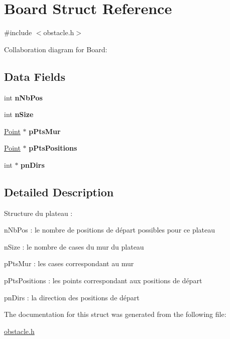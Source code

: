 \hypertarget{struct_board}{}\section{Board Struct Reference}
\label{struct_board}


{\ttfamily \#include $<$obstacle.\+h$>$}



Collaboration diagram for Board\+:
\subsection*{Data Fields}
\begin{DoxyCompactItemize}
\item 
\hypertarget{struct_board_a5144d35dd645892013c497cebb2e9b1f}{}int {\bfseries n\+Nb\+Pos}\label{struct_board_a5144d35dd645892013c497cebb2e9b1f}

\item 
\hypertarget{struct_board_a69eba13a7543e1379e705b54823531a9}{}int {\bfseries n\+Size}\label{struct_board_a69eba13a7543e1379e705b54823531a9}

\item 
\hypertarget{struct_board_a15b7375925a07516d82c52733ec16874}{}\hyperlink{struct_point}{Point} $\ast$ {\bfseries p\+Pts\+Mur}\label{struct_board_a15b7375925a07516d82c52733ec16874}

\item 
\hypertarget{struct_board_ab251fa666350a133b8b089a26c93a623}{}\hyperlink{struct_point}{Point} $\ast$ {\bfseries p\+Pts\+Positions}\label{struct_board_ab251fa666350a133b8b089a26c93a623}

\item 
\hypertarget{struct_board_a1548ed096f3589f9a471cfad9795f6cd}{}int $\ast$ {\bfseries pn\+Dirs}\label{struct_board_a1548ed096f3589f9a471cfad9795f6cd}

\end{DoxyCompactItemize}


\subsection{Detailed Description}
Structure du plateau \+:
\begin{DoxyItemize}
\item n\+Nb\+Pos \+: le nombre de positions de départ possibles pour ce plateau
\item n\+Size \+: le nombre de cases du mur du plateau
\item p\+Pts\+Mur \+: les cases correspondant au mur
\item p\+Pts\+Positions \+: les points correspondant aux positions de départ
\item pn\+Dirs \+: la direction des positions de départ 
\end{DoxyItemize}

The documentation for this struct was generated from the following file\+:\begin{DoxyCompactItemize}
\item 
\hyperlink{obstacle_8h}{obstacle.\+h}\end{DoxyCompactItemize}
